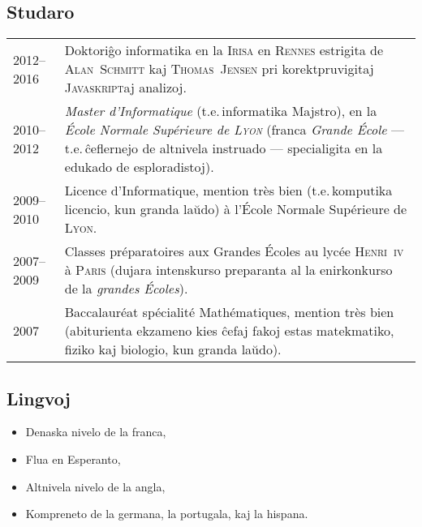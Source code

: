 \documentclass[12pt,a4paper]{article}
\makeatletter
\newcommand{\fr}[1]{\foreignlanguage{francais}{\textit{#1}}}
\newcommand{\ie}{t.e.\,}
\newenvironment{datecvsection}[1]%
               {\subsection*{#1}%
                 \noindent \begin{tabular}{@{}p{\annee}p{\texte}@{}}}
               {\end{tabular}}
\newenvironment{cvsection}[1]%
               {\subsection*{#1}}
               {}
\makeatother
\begin{document}
\begin{datecvsection}{Studaro}

	2012–2016 & Doktoriĝo informatika en la \textsc{Irisa} en \textsc{Rennes} estrigita de \textsc{Alan~Schmitt} kaj \textsc{Thomas~Jensen} pri korektpruvigitaj \textsc{Javaskript}aj analizoj. \\

	2010–2012 & \fr{Master d’Informatique} (\ie informatika Majstro), en la \fr{École Normale Supérieure de \textsc{Lyon}} (franca \fr{Grande École} — \ie ĉeflernejo de altnivela instruado — specialigita en la edukado de esploradistoj). \\

    2009–2010 & Licence d’Informatique, mention très bien (\ie komputika licencio, kun granda laŭdo) à l’École Normale Supérieure de \textsc{Lyon}. \\

    2007–2009 & Classes préparatoires aux Grandes Écoles au lycée \textsc{Henri~iv} à \textsc{Paris} (dujara intenskurso preparanta al la enirkonkurso de la \fr{grandes Écoles}). \\

    2007 & Baccalauréat spécialité Mathématiques, mention très bien (abiturienta ekzameno kies ĉefaj fakoj estas matekmatiko, fiziko kaj biologio, kun granda laŭdo). \\

\end{datecvsection}

\begin{cvsection}{Lingvoj}
\parbox{.4\textwidth}{
\begin{itemize}
   \item Denaska nivelo de la franca,
   \item Flua en Esperanto,
\end{itemize}}
\parbox{.55\textwidth}{
\begin{itemize}
   \item Altnivela nivelo de la angla,
   \item Kompreneto de la germana, la portugala, kaj la hispana.
\end{itemize}}
\end{cvsection}
\end{document}
